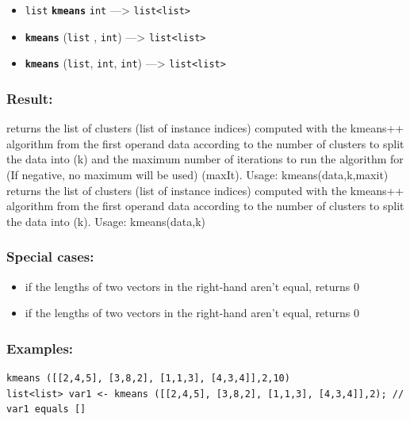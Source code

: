 \documentclass[]{book}
\providecommand{\tightlist}{%
  \setlength{\itemsep}{0pt}\setlength{\parskip}{0pt}}
\theoremstyle{definition}
\theoremstyle{definition}
\theoremstyle{definition}
\theoremstyle{remark}
\begin{document}
\begin{itemize}
\tightlist
\item
  \texttt{list} \textbf{\texttt{kmeans}} \texttt{int} ---\textgreater{}
  \texttt{list\textless{}list\textgreater{}}
\item
  \textbf{\texttt{kmeans}} (\texttt{list} , \texttt{int})
  ---\textgreater{} \texttt{list\textless{}list\textgreater{}}
\item
  \textbf{\texttt{kmeans}} (\texttt{list}, \texttt{int}, \texttt{int})
  ---\textgreater{} \texttt{list\textless{}list\textgreater{}}
\end{itemize}

\subsubsection{Result:}\label{result-303}

returns the list of clusters (list of instance indices) computed with
the kmeans++ algorithm from the first operand data according to the
number of clusters to split the data into (k) and the maximum number of
iterations to run the algorithm for (If negative, no maximum will be
used) (maxIt). Usage: kmeans(data,k,maxit) returns the list of clusters
(list of instance indices) computed with the kmeans++ algorithm from the
first operand data according to the number of clusters to split the data
into (k). Usage: kmeans(data,k)

\subsubsection{Special cases:}\label{special-cases-82}

\begin{itemize}
\tightlist
\item
  if the lengths of two vectors in the right-hand aren't equal, returns
  0\\
\item
  if the lengths of two vectors in the right-hand aren't equal, returns
  0
\end{itemize}

\subsubsection{Examples:}\label{examples-220}

\begin{verbatim}
kmeans ([[2,4,5], [3,8,2], [1,1,3], [4,3,4]],2,10)  
list<list> var1 <- kmeans ([[2,4,5], [3,8,2], [1,1,3], [4,3,4]],2); // var1 equals []
\end{verbatim}
\end{document}
